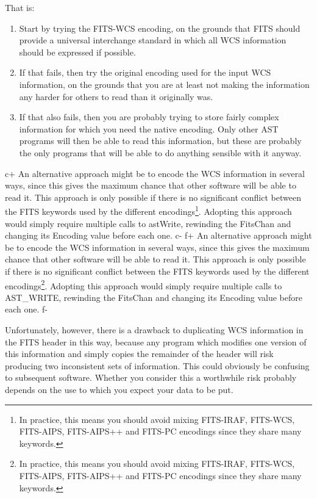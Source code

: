 \documentclass[twoside,11pt]{article}
\begin{document}
That is:

\begin{enumerate}
\item Start by trying the FITS-WCS encoding, on the grounds that FITS
should provide a universal interchange standard in which all WCS
information should be expressed if possible.

\item If that fails, then try the original encoding used for the input
WCS information, on the grounds that you are at least not making the
information any harder for others to read than it originally was.

\item If that also fails, then you are probably trying to store fairly
complex information for which you need the native encoding. Only other
AST programs will then be able to read this information, but these are
probably the only programs that will be able to do anything sensible
with it anyway.
\end{enumerate}

c+
An alternative approach might be to encode the WCS information in several
ways, since this gives the maximum chance that other software will be
able to read it. This approach is only possible if there is no
significant conflict between the FITS keywords used by the different
encodings\footnote{In practice, this means you should avoid mixing
FITS-IRAF, FITS-WCS, FITS-AIPS, FITS-AIPS++ and FITS-PC encodings since they share
many keywords.}.  Adopting this approach would simply require multiple
calls to astWrite, rewinding the FitsChan and changing its Encoding value
before each one.
c-
f+
An alternative approach might be to encode the WCS information in several
ways, since this gives the maximum chance that other software will be
able to read it. This approach is only possible if there is no
significant conflict between the FITS keywords used by the different
encodings\footnote{In practice, this means you should avoid mixing
FITS-IRAF, FITS-WCS, FITS-AIPS, FITS-AIPS++ and FITS-PC encodings since they share
many keywords.}.  Adopting this approach would simply require multiple
calls to AST\_WRITE, rewinding the FitsChan and changing its Encoding value
before each one.
f-

Unfortunately, however, there is a drawback to duplicating WCS
information in the FITS header in this way, because any program which
modifies one version of this information and simply copies the
remainder of the header will risk producing two inconsistent sets of
information. This could obviously be confusing to subsequent
software. Whether you consider this a worthwhile risk probably depends
on the use to which you expect your data to be put.
\end{document}
